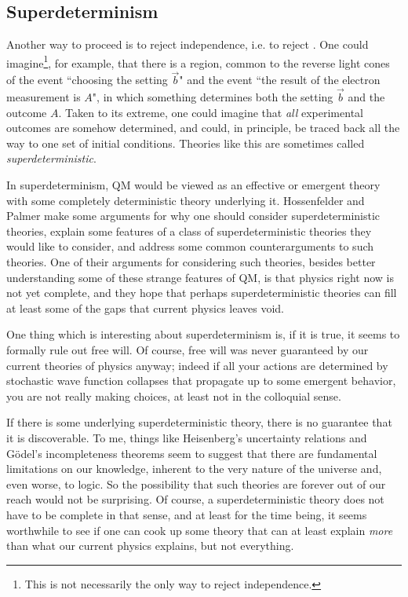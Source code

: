 \subsection{Superdeterminism}

Another way to proceed is to reject independence, i.e. to reject
. One could imagine\footnote{This is not necessarily
the only way to reject independence.}, for example, that there
is a region, common to the reverse light cones of the event ``choosing the
setting $\vec{b}$" and the event ``the result of the electron measurement
is $A$", in which something determines both the setting $\vec{b}$ and
the outcome $A$. Taken to its extreme, one could imagine that {\it all}
experimental outcomes are somehow determined, and could, in principle, be
traced back all the way to one set of initial conditions. Theories like
this are sometimes called {\it superdeterministic}.

In superdeterminism, QM would be viewed as an effective or emergent theory
with some completely deterministic theory underlying it. Hossenfelder
and Palmer \cite{hossenfelder_rethinking_2020} make some arguments for
why one should consider superdeterministic theories, explain some features
of a class of superdeterministic theories they would like to consider, and
address some common counterarguments to such theories. One of their arguments
for considering such theories, besides better understanding some of these
strange features of QM, is that physics right now is not yet complete,
and they hope that perhaps superdeterministic theories can fill at least
some of the gaps that current physics leaves void.

One thing which is interesting about superdeterminism is, if it is true,
it seems to formally rule out free will. Of course, free will was never
guaranteed by our current theories of physics anyway; indeed if all your
actions are determined by stochastic wave function collapses that 
propagate up to some emergent behavior, you are not really making
choices, at least not in the colloquial sense.

If there is some underlying superdeterministic theory, there is no guarantee
that it is discoverable. To me, things like Heisenberg's uncertainty relations
and G\"odel's incompleteness theorems seem to suggest that there are
fundamental limitations on our knowledge, inherent to the very nature of
the universe and, even worse, to logic. So the possibility that such theories
are forever out of our reach would not be surprising. Of course, a
superdeterministic theory does not have to be complete in that sense, and 
at least for the time being, it seems worthwhile to see if one can cook up
some theory that can at least explain {\it more} than what our current
physics explains, but not everything.





